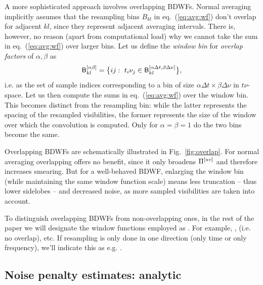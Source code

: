 \documentclass[useAMS,usenatbib]{mn2e}
\newcommand{\OMS}[1]{\textcolor{red}{{\bf OMS: #1}}}
\begin{document}
A more sophisticated approach involves overlapping BDWFs. Normal averaging implicitly assumes that the resampling bins $B_{kl}$ 
in eq.~(\ref{eq:avg:wf}) don't overlap for adjacent $kl$, since they represent adjacent averaging intervals.
There is, however, no reason (apart from computational load) why we cannot take the sum in eq.~(\ref{eq:avg:wf}) 
over larger bins. Let us define the \emph{window bin} for \emph{overlap factors} of $\alpha,\beta$ as
\begin{equation}
\mathsf{B}^{[\alpha\beta]}_{kl} = \big \{ ij:~t_i\nu_j \in \mathsf{B}^{[\alpha\Delta t,\beta\Delta\nu]}_{kl} \big \},
\end{equation}
i.e. as the set of sample indices corresponding to a bin of size $\alpha\Delta t\times\beta\Delta \nu$ in $t\nu$-space.
Let us then compute the sums in eq.~(\ref{eq:avg:wf}) over the window bin. This becomes distinct from the
resampling bin: while the latter represents the spacing of the resampled visibilities, the former represents the size 
of the window over which the convolution is computed. Only for $\alpha=\beta=1$ do the two bins become the same.

Overlapping BDWFs are schematically illustrated in Fig.~\ref{fig:overlap}. For normal averaging 
overlapping offers no benefit, since it only broadens $\Pi^{[uv]}$ and therefore increases smearing. But for a well-behaved 
BDWF, enlarging the window bin (while maintaining the same window function scale) means less truncation -- thus lower 
sidelobes -- and decreased noise, as more sampled visibilities are taken into account.

To distinguish overlapping BDWFs from non-overlapping ones, in the rest of the paper we will designate the 
window functions employed as . For example, ,  (i.e. no overlap), etc.
If resampling is only done in one direction (only time or only frequency), we'll indicate this as e.g. .

\subsection{Noise penalty estimates: analytic}
\label{sec:imaging}
\end{document}
